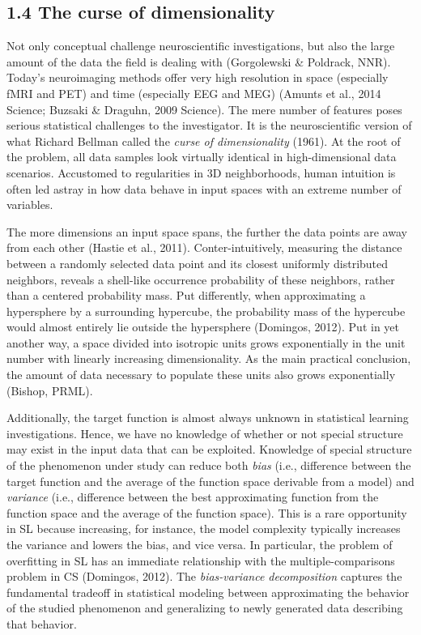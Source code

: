 \documentclass[authoryear,review,3p]{elsarticle}
\begin{document}
\subsection*{1.4 The curse of dimensionality}

Not only conceptual challenge neuroscientific investigations,
but also the large amount of the data the field is dealing with
(Gorgolewski \& Poldrack, NNR).
%
Today's neuroimaging methods offer very high resolution in
space (especially fMRI and PET)
and
time (especially EEG and MEG)
(Amunts et al., 2014 Science; Buzsaki \& Draguhn, 2009 Science).
%
The mere number of features poses serious
statistical challenges to the investigator.
It is the neuroscientific version of what Richard Bellman
called the \textit{curse of dimensionality} (1961).
%
At the root of the problem,
all data samples look virtually identical
in high-dimensional data scenarios.
%
Accustomed to regularities in 3D neighborhoods,
human intuition is often led astray in
how data behave in
input spaces with an extreme number of variables.



The more dimensions an input space spans,
the further the data points are away from each other
(Hastie et al., 2011).
Conter-intuitively,
measuring the distance between a randomly selected data point
and its closest uniformly distributed neighbors,
reveals a shell-like occurrence probability of
these neighbors, rather than a centered probability mass.
%
Put differently,
when approximating a hypersphere by a surrounding hypercube,
the probability mass of the hypercube
would almost entirely lie outside the hypersphere
(Domingos, 2012).
%
Put in yet another way,
a space divided into isotropic units grows exponentially in the
unit number with linearly increasing dimensionality.
As the main practical conclusion,
the amount of data necessary to populate these units
also grows exponentially
(Bishop, PRML).



Additionally,
the target function is almost always unknown
in statistical learning investigations.
Hence, we have no knowledge of whether or not
special structure may exist in the input data that can be exploited.
%
Knowledge of special structure of the phenomenon under study
can reduce both \textit{bias}
(i.e., difference between the target function and
the average of the function space derivable from a model)
and
\textit{variance}
(i.e., difference between the best approximating function 
from the function space and
the average of the function space).
This is a rare opportunity in SL because increasing,
for instance, the model complexity
typically increases the variance and lowers the bias, and vice versa.
%
In particular,
the problem of overfitting in SL has an immediate relationship
with the multiple-comparisons problem in CS
(Domingos, 2012).
%
The \textit{bias-variance decomposition} captures the fundamental
tradeoff in statistical modeling between
approximating the behavior of
the studied phenomenon and
generalizing to newly generated data describing that behavior. 
\end{document}
